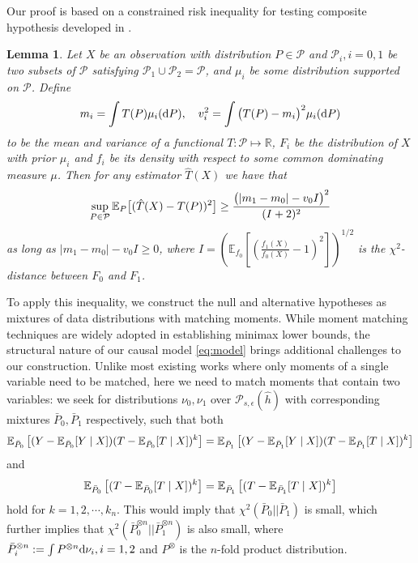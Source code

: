 \documentclass{article}
\def\eps{{\epsilon}}
\def\gP{{\mathcal{P}}}
\newcommand{\E}{\mathbb{E}}
\newcommand{\R}{\mathbb{R}}
\newcommand{\dd}{\textup{d}}
\newtheorem{lemma}{Lemma}[section]
\begin{document}
%
Our proof is based on a constrained risk inequality for testing composite hypothesis developed in \citet{cai2011testing}. 
\begin{lemma}
    \label{thm:fuzzy-bound}
     \citep[Corollary 1]{cai2011testing} Let $X$ be an observation with distribution $P\in\gP$ and $\gP_i, i=0,1$ be two subsets of $\gP$ satisfying $\gP_1\cup\gP_2=\gP$, and $\mu_i$ be some distribution supported on $\gP$. Define
    \begin{equation}
        \label{eq:thm-fuzzy-mean-var}
        m_i = \int T(P) \mu_i(\dd P),\quad v_i^2 = \int \big(T(P)-m_i\big)^2 \mu_i(\dd P)
    \end{equation}
    to be the mean and variance of a functional $T:\gP\mapsto\R$, $F_i$ be the distribution of $X$ with prior $\mu_i$ and $f_i$ be its density with respect to some common dominating measure $\mu$. Then for any estimator $\hat{T}(X)$ we have that
    \begin{equation}
        \notag
        \sup_{P\in\gP} \E_P\big[ (\hat{T}(X)-T(P))^2  \big] \geq\frac{\big(|m_1-m_0|-v_0I\big)^2}{(I+2)^2}
    \end{equation}
    as long as $|m_1-m_0|-v_0I\geq 0$, where $I = \left(\E_{f_0}\left[ \left(\frac{f_1(X)}{f_0(X)}-1\right)^2 \right]\right)^{1/2}$ is the $\chi^2$-distance between $F_0$ and $F_1$.
\end{lemma}

To apply this inequality, we construct the null and alternative hypotheses as mixtures of data distributions with matching moments. While moment matching techniques are widely adopted in establishing minimax lower bounds, the structural nature of our causal model \eqref{eq:model} brings additional challenges to our construction. Unlike most existing works where only moments of a single variable need to be matched, here we need to match moments that contain two variables: we seek for distributions $\nu_0, \nu_1$ over $\gP_{s,\eps}(\hat{h})$ with corresponding mixtures $\bar{P}_0,\bar{P}_1$ respectively, such that both
\begin{equation}
    \notag
    \E_{\bar{P}_0}\left[(Y-\E_{\bar{P}_0}[Y\mid X])(T-\E_{\bar{P}_0}[T\mid X])^k\right] = \E_{\bar{P}_1}\left[(Y-\E_{\bar{P}_1}[Y\mid X])(T-\E_{\bar{P}_1}[T\mid X])^k\right]
\end{equation}
and
\begin{equation}
    \notag
    \E_{\bar{P}_0}\left[(T-\E_{\bar{P}_0}[T\mid X])^k\right] = \E_{\bar{P}_1}\left[(T-\E_{\bar{P}_1}[T\mid X])^k\right]
\end{equation}
hold for $k=1,2,\cdots,k_n$. This would imply that $\chi^2(\bar{P}_0||\bar{P}_1)$ is small, which further implies that $\chi^2(\bar{P}_0^{\otimes n}||\bar{P}_1^{\otimes n})$ is also small, where $\bar{P}_i^{\otimes n} := \int P^{\otimes n} \dd \nu_i, i=1,2$ and $P^{\otimes}$ is the $n$-fold product distribution.
\end{document}
